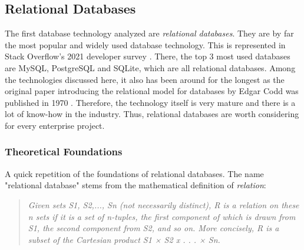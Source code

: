 \subsection{Relational Databases}
The first database technology analyzed are \textit{relational databases}. They are by far the most popular and widely used database technology. This is represented in Stack Overflow's 2021 developer survey \cite{StackoverflowDeveloperSurvey}. There, the top 3 most used databases are MySQL, PostgreSQL and SQLite, which are all relational databases. Among the technologies discussed here, it also has been around for the longest as the original paper introducing the relational model for databases by Edgar Codd was published in 1970 \cite{RelationalDatabaseOriginalPaper}. Therefore, the technology itself is very mature and there is a lot of know-how in the industry. Thus, relational databases are worth considering for every enterprise project.

\subsubsection{Theoretical Foundations} \label{sec:Theoretical Foundations Relational Database}
A quick repetition of the foundations of relational databases. The name "relational database" stems from the mathematical definition of \emph{relation}: 

\begin{quote}
	\textit{Given sets S1, S2,..., Sn (not necessarily distinct), R is a relation on these n sets if it is a set of n-tuples, the first component of which is drawn from S1, the second component from S2, and so on. More concisely, R is a subset of the Cartesian product S1 × S2 x . . . × Sn.}
	\cite{RelationalDatabaseModel}
\end{quote}


